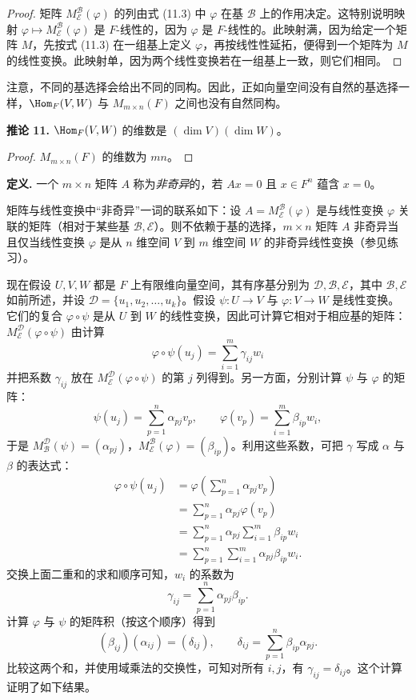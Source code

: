 \begin{proof}
矩阵 $M_{\mathcal E}^{\mathcal B}(\varphi)$ 的列由式 (11.3) 中 $\varphi$ 在基 $\mathcal B$ 上的作用决定。这特别说明映射 $\varphi\mapsto M_{\mathcal E}^{\mathcal B}(\varphi)$ 是 $F$-线性的，因为 $\varphi$ 是 $F$-线性的。此映射满，因为给定一个矩阵 $M$，先按式 (11.3) 在一组基上定义 $\varphi$，再按线性性延拓，便得到一个矩阵为 $M$ 的线性变换。此映射单，因为两个线性变换若在一组基上一致，则它们相同。
\end{proof}

注意，不同的基选择会给出不同的同构。因此，正如向量空间没有自然的基选择一样，$\Hom_F(V,W)$ 与 $M_{m\times n}(F)$ 之间也没有自然同构。

\noindent\textbf{推论 11.} $\Hom_F(V,W)$ 的维数是 $(\dim V)(\dim W)$。

\begin{proof}
$M_{m\times n}(F)$ 的维数为 $mn$。
\end{proof}

\noindent\textbf{定义.} 一个 $m\times n$ 矩阵 $A$ 称为\emph{非奇异}的，若 $Ax=0$ 且 $x\in F^n$ 蕴含 $x=0$。

矩阵与线性变换中“非奇异”一词的联系如下：设 $A=M_{\mathcal E}^{\mathcal B}(\varphi)$ 是与线性变换 $\varphi$ 关联的矩阵（相对于某些基 $\mathcal B,\mathcal E$）。则不依赖于基的选择，$m\times n$ 矩阵 $A$ 非奇异当且仅当线性变换 $\varphi$ 是从 $n$ 维空间 $V$ 到 $m$ 维空间 $W$ 的非奇异线性变换（参见练习）。

现在假设 $U,V,W$ 都是 $F$ 上有限维向量空间，其有序基分别为 $\mathcal D,\mathcal B,\mathcal E$，其中 $\mathcal B,\mathcal E$ 如前所述，并设 $\mathcal D=\{u_1,u_2,\ldots,u_k\}$。假设 $\psi:U\to V$ 与 $\varphi:V\to W$ 是线性变换。它们的复合 $\varphi\circ\psi$ 是从 $U$ 到 $W$ 的线性变换，因此可计算它相对于相应基的矩阵：$M_{\mathcal E}^{\mathcal D}(\varphi\circ\psi)$ 由计算
\[
\varphi\circ\psi(u_j)=\sum_{i=1}^m\gamma_{ij}w_i
\]
并把系数 $\gamma_{ij}$ 放在 $M_{\mathcal E}^{\mathcal D}(\varphi\circ\psi)$ 的第 $j$ 列得到。另一方面，分别计算 $\psi$ 与 $\varphi$ 的矩阵：
\[
\psi(u_j)=\sum_{p=1}^n\alpha_{pj}v_p,
\qquad
\varphi(v_p)=\sum_{i=1}^m\beta_{ip}w_i,
\]
于是 $M_{\mathcal B}^{\mathcal D}(\psi)=(\alpha_{pj})$，$M_{\mathcal E}^{\mathcal B}(\varphi)=(\beta_{ip})$。利用这些系数，可把 $\gamma$ 写成 $\alpha$ 与 $\beta$ 的表达式：
\[
\begin{aligned}
\varphi\circ\psi(u_j)
&=\varphi\left(\sum_{p=1}^n\alpha_{pj}v_p\right)\\
&=\sum_{p=1}^n\alpha_{pj}\varphi(v_p)\\
&=\sum_{p=1}^n\alpha_{pj}\sum_{i=1}^m\beta_{ip}w_i\\
&=\sum_{p=1}^n\sum_{i=1}^m\alpha_{pj}\beta_{ip}w_i.
\end{aligned}
\]
交换上面二重和的求和顺序可知，$w_i$ 的系数为
\[
\gamma_{ij}=\sum_{p=1}^n\alpha_{pj}\beta_{ip}.
\]
计算 $\varphi$ 与 $\psi$ 的矩阵积（按这个顺序）得到
\[
(\beta_{ij})(\alpha_{ij})=(\delta_{ij}),
\qquad
\delta_{ij}=\sum_{p=1}^n\beta_{ip}\alpha_{pj}.
\]
比较这两个和，并使用域乘法的交换性，可知对所有 $i,j$，有 $\gamma_{ij}=\delta_{ij}$。这个计算证明了如下结果。

